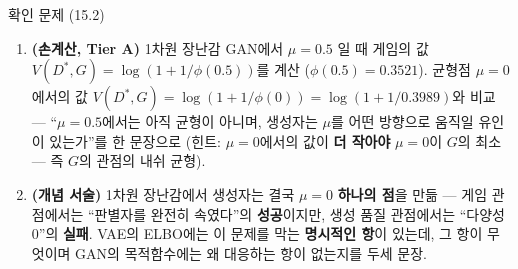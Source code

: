 \documentclass[aspectratio=169,11pt]{beamer}
\begin{document}

\begin{frame}{확인 문제 (15.2)}
  \begin{enumerate}
    \item \textbf{(손계산, Tier A)} 1차원 장난감 GAN에서 $\mu = 0.5$
      일 때 게임의 값 $V(D^*, G) = \log(1 + 1/\phi(0.5))$를 계산
      ($\phi(0.5) = 0.3521$). 균형점 $\mu = 0$에서의 값
      $V(D^*, G) = \log(1 + 1/\phi(0)) = \log(1 + 1/0.3989)$와
      비교 — ``$\mu = 0.5$에서는 아직 균형이 아니며, 생성자는
      $\mu$를 어떤 방향으로 움직일 유인이 있는가''를 한 문장으로
      (힌트: $\mu = 0$에서의 값이 \textbf{더 작아야} $\mu = 0$이
      $G$의 최소 — 즉 $G$의 관점의 내쉬 균형).
    \item \textbf{(개념 서술)} 1차원 장난감에서 생성자는 결국
      $\mu = 0$ \textbf{하나의 점}을 만듦 — 게임 관점에서는
      ``판별자를 완전히 속였다''의 \textbf{성공}이지만, 생성
      품질 관점에서는 ``다양성 0''의 \textbf{실패}. VAE의 ELBO에는
      이 문제를 막는 \textbf{명시적인 항}이 있는데, 그 항이 무엇이며
      GAN의 목적함수에는 왜 대응하는 항이 없는지를 두세 문장.
  \end{enumerate}
\end{frame}
\end{document}
